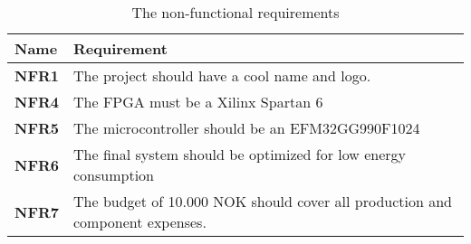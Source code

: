 \begin{table}[H]
\centering
    \begin{tabular}{| l | p{8cm} |}
    \hline
    \textbf{Name} & \textbf{Requirement}\\
    \hline \hline
    \textbf{NFR1} & The project should have a cool name and logo. \\
    \textbf{NFR4} & The FPGA must be a Xilinx Spartan 6 \\
    \textbf{NFR5} & The microcontroller should be an EFM32GG990F1024 \\
    \textbf{NFR6} & The final system should be optimized for low energy consumption \\
    \textbf{NFR7} & The budget of 10.000 NOK should cover all production 
    and component expenses. \\

    \hline
    \end{tabular}
    \caption{The non-functional requirements}
    \label{tab:nonfunref}
\end{table}